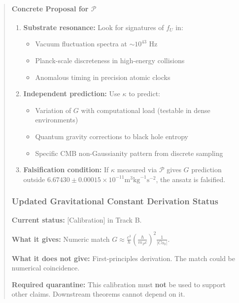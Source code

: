\documentclass[11pt,titlepage]{article}
\begin{document}
\begin{abstract}
\paragraph{Concrete Proposal for $\mathcal{P}$}
\begin{enumerate}
\item \textbf{Substrate resonance:} Look for signatures of $f_U$ in:
\begin{itemize}
\item Vacuum fluctuation spectra at $\sim 10^{43}$ Hz
\item Planck-scale discreteness in high-energy collisions
\item Anomalous timing in precision atomic clocks
\end{itemize}

\item \textbf{Independent prediction:} Use $\kappa$ to predict:
\begin{itemize}
\item Variation of $G$ with computational load (testable in dense environments)
\item Quantum gravity corrections to black hole entropy
\item Specific CMB non-Gaussianity pattern from discrete sampling
\end{itemize}

\item \textbf{Falsification condition:} If $\kappa$ measured via $\mathcal{P}$ gives $G$ prediction outside $6.67430 \pm 0.00015 \times 10^{-11} \text{m}^3\text{kg}^{-1}\text{s}^{-2}$, the ansatz is falsified.
\end{enumerate}

\subsubsection{Updated Gravitational Constant Derivation Status}

\begin{tcolorbox}[colback=blue!5!white,colframe=blue!75!black,title=Status: $G$ from $|Co_0|$]
\textbf{Current status:} [Calibration] in Track B.

\textbf{What it gives:} Numeric match $G \approx \frac{c^3}{\hbar} \left(\frac{\hbar}{m_P c}\right)^2 \frac{1}{|Co_0|}$.

\textbf{What it does not give:} First-principles derivation. The match could be numerical coincidence.

\textbf{Required quarantine:} This calibration must \textbf{not} be used to support other claims. Downstream theorems cannot depend on it.
\end{tcolorbox}


\end{abstract}
\end{document}
